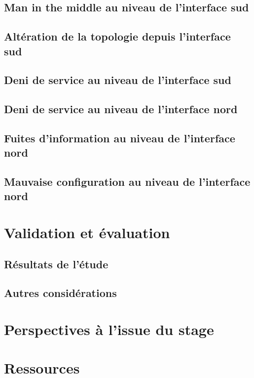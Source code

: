 \documentclass[a4paper,10pt]{article}
\begin{document}
	\subsection{Man in the middle au niveau de l'interface sud}
	\subsection{Altération de la topologie depuis l'interface sud}
	\subsection{Deni de service au niveau de l'interface sud}
	\subsection{Deni de service au niveau de l'interface nord}
	\subsection{Fuites d'information au niveau de l'interface nord}
	\subsection{Mauvaise configuration au niveau de l'interface nord}
\section{Validation et évaluation}
	\subsection{Résultats de l'étude}
	\subsection{Autres considérations}
\section{Perspectives à l'issue du stage}
\section{Ressources}


~

\newpage

\nocite{*}



\end{document}
